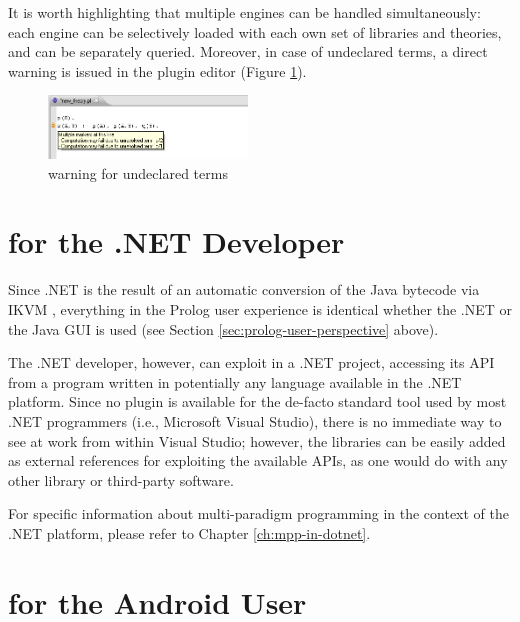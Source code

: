 It is worth highlighting that multiple \tuprolog{}  engines can be handled simultaneously: each engine can be selectively loaded with each own set of libraries and theories, and can be separately queried.
%
Moreover, in case of undeclared terms, a direct warning is issued in the plugin editor  (Figure \ref{fig:plugin11}).

\begin{figure}
  \includegraphics[width=200px]{images/plugin11.png}
  \caption{warning for undeclared terms}\label{fig:plugin11}
\end{figure}

\section{\tuprolog{} for the .NET Developer}
\label{sec:dotnet-user-perspective}

Since \tuprolog{}.NET is the result of an automatic conversion of the Java bytecode via IKVM \cite{ikvm}, everything in the Prolog user experience is identical whether the .NET or the Java GUI is used (see Section \ref{sec:prolog-user-perspective} above).

The .NET developer, however, can exploit \tuprolog{} in a .NET project, accessing its API from a program written in potentially any language available in the .NET platform.
%
Since no plugin is available for the de-facto standard tool used by most .NET programmers (i.e., Microsoft Visual Studio), there is no immediate way to see \tuprolog{} at work from within Visual Studio; however, the \tuprolog{} libraries can be easily added as external references for exploiting the available APIs, as one would do with any other library or third-party software.

For specific information about multi-paradigm programming in the context of the .NET platform, please refer to Chapter \ref{ch:mpp-in-dotnet}.


\section{\tuprolog{} for the Android User}
\label{sec:android-user-perspective}

